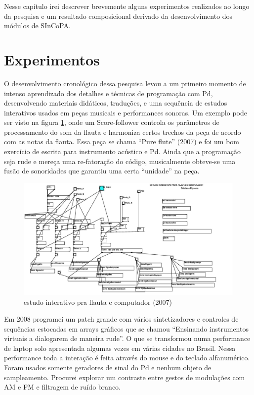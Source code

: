 \documentclass[draft]{ppgmus}
\begin{document}
Nesse capítulo irei descrever brevemente alguns experimentos realizados
ao longo da pesquisa e um resultado composicional derivado
da desenvolvimento dos módulos de SInCoPA.

\section{Experimentos}
\label{experimentos}

O desenvolvimento cronológico dessa pesquisa levou a um primeiro momento de intenso aprendizado
dos detalhes e técnicas de programação com Pd, desenvolvendo materiais didáticos, traduções, e uma
sequência de estudos interativos usados em peças musicais e performances sonoras. Um exemplo pode ser visto
na figura \ref{flauta2007}, onde um Score-follower controla os parâmetros de 
processamento do som da flauta e harmoniza certos trechos da peça de acordo com as notas da flauta.
Essa peça se chama ``Pure flute'' (2007) e foi um bom exercício de escrita para instrumento acústico
e Pd. Ainda que a programação seja rude e mereça uma re-fatoração do código, musicalmente 
obteve-se uma fusão de sonoridades que garantiu uma certa ``unidade'' na peça.

\begin{figure}
\includegraphics[scale=.3]{flauta2007}
\caption{estudo interativo pra flauta e computador (2007)}
\label{flauta2007}
\end{figure} 

Em 2008 programei um patch grande com vários sintetizadores e controles de sequências estocadas
em arrays gráficos que se chamou ``Ensinando instrumentos virtuais a dialogarem de maneira rude''.
O que se transformou numa performance de laptop solo apresentada algumas vezes em várias
cidades no Brasil. Nessa performance toda a interação é feita através do mouse e do 
teclado alfanumérico. Foram usados somente geradores de sinal do Pd e nenhum objeto de sampleamento.
 Procurei explorar um contraste entre gestos de modulações com AM e FM e filtragem de ruído branco.
\end{document}
